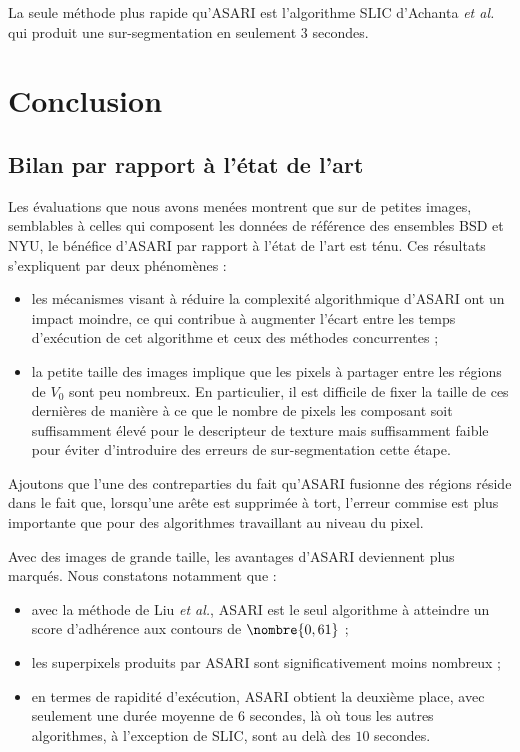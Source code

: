 La seule méthode plus rapide qu'ASARI est l'algorithme SLIC d'Achanta \textit{et al.} qui produit une sur-segmentation en seulement $3$ secondes.

\section{Conclusion}
\subsection{Bilan par rapport à l'état de l'art}
Les évaluations que nous avons menées montrent que sur de petites images, semblables à celles qui composent les données de référence des ensembles BSD et NYU, le bénéfice d'ASARI par rapport à l'état de l'art est ténu. Ces résultats s'expliquent par deux phénomènes :
\begin{itemize}
\item les mécanismes visant à réduire la complexité algorithmique d'ASARI ont un impact moindre, ce qui contribue à augmenter l'écart entre les temps d'exécution de cet algorithme et ceux des méthodes concurrentes ;
\item la petite taille des images implique que les pixels à partager entre les régions de $V_{0}$ sont peu nombreux. En particulier, il est difficile de fixer la taille de ces dernières de manière à ce que le nombre de pixels les composant soit suffisamment élevé pour le descripteur de texture mais suffisamment faible pour éviter d'introduire des erreurs de sur-segmentation  cette étape.
\end{itemize}
Ajoutons que l'une des contreparties du fait qu'ASARI fusionne des régions réside dans le fait que, lorsqu'une arête est supprimée à tort, l'erreur commise est plus importante que pour des algorithmes travaillant au niveau du pixel.

Avec des images de grande taille, les avantages d'ASARI deviennent plus marqués. Nous constatons notamment que :
\begin{itemize}
\item avec la méthode de Liu \textit{et al.}, ASARI est le seul algorithme à atteindre un score d'adhérence aux contours de $\nombre{0,61}$ ;
\item les superpixels produits par ASARI sont significativement moins nombreux ;
\item en termes de rapidité d'exécution, ASARI obtient la deuxième place, avec seulement une durée moyenne de $6$ secondes, là où tous les autres algorithmes, à l'exception de SLIC, sont au delà des $10$ secondes.
\end{itemize}

